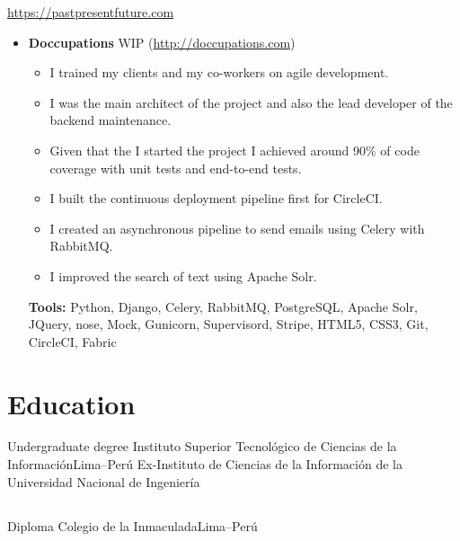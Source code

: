 \documentclass[11pt,a4paper,english]{moderncv}
\begin{document}
{
\url{https://pastpresentfuture.com}
\newline{}
\begin{itemize}
    \item \textbf{Doccupations}
        \newline{}
        WIP (\url{http://doccupations.com})
        \begin{itemize}
            \item I trained my clients and my co-workers on agile development.
            \item I was the main architect of the project and also the lead developer of the backend maintenance.
            \item Given that the I started the project I achieved around 90\% of code coverage with unit tests and end-to-end tests.
            \item I built the continuous deployment pipeline first for CircleCI.
            \item I created an asynchronous pipeline to send emails using Celery with RabbitMQ.
            \item I improved the search of text using Apache Solr.
        \end{itemize}
        \textbf{Tools:} Python, Django, Celery, RabbitMQ, PostgreSQL, Apache Solr, JQuery, nose, Mock, Gunicorn, Supervisord, Stripe, HTML5, CSS3, Git, CircleCI, Fabric
\end{itemize}
}

\subsection{}

\section{Education}
    {Undergraduate degree}
    {Instituto Superior Tecnológico de Ciencias de la Información}{Lima--Perú}
    {}{Ex-Instituto de Ciencias de la Información de la Universidad Nacional de Ingeniería}

\subsection{}

    {Diploma}
    {Colegio de la Inmaculada}{Lima--Perú}
    {}{}
\end{document}
